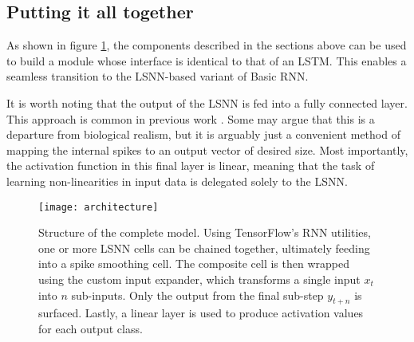 \documentclass[../../report.tex]{subfiles}
\begin{document}
\subsection{Putting it all together}

As shown in figure \ref{fig:architecture}, the components described in the
sections above can be used to build a module whose interface is identical to
that of an LSTM. This enables a seamless transition to the LSNN-based variant of
Basic RNN.

It is worth noting that the output of the LSNN is fed into a fully connected
layer. This approach is common in previous work \cite{Bellec2018LSNN,
Bellec2020}. Some may argue that this is a departure from biological realism,
but it is arguably just a convenient method of mapping the internal spikes to an
output vector of desired size. Most importantly, the activation function in this
final layer is linear, meaning that the task of learning non-linearities in
input data is delegated solely to the LSNN.

\begin{figure}
  \centering
  \texttt{[image: architecture]}
  \caption{Structure of the complete model. Using TensorFlow's RNN utilities,
  one or more LSNN cells can be chained together, ultimately feeding into a
  spike smoothing cell. The composite cell is then wrapped using the custom
  input expander, which transforms a single input \(x_t\) into \(n\) sub-inputs.
  Only the output from the final sub-step \(y_{t+n}\) is surfaced. Lastly, a
  linear layer is used to produce activation values for each output class.}
  \label{fig:architecture}
\end{figure}
\end{document}
